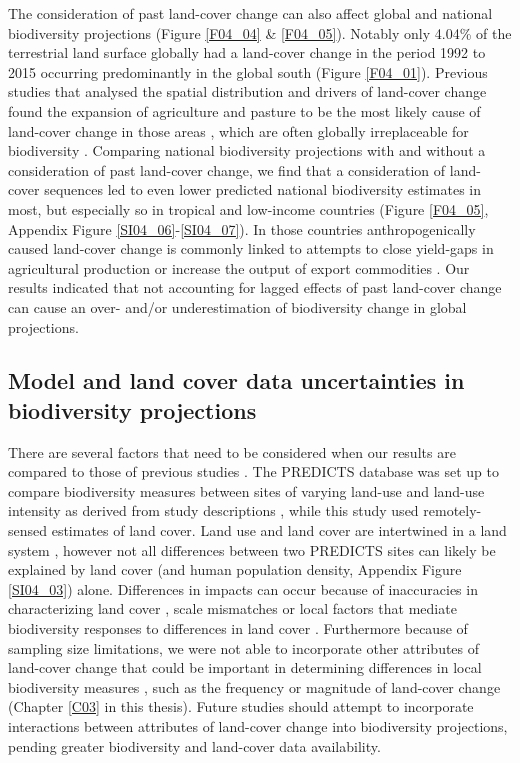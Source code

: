 The consideration of past land-cover change can also affect global and national biodiversity projections (Figure \ref{F04_04} \& \ref{F04_05}). Notably only 4.04\% of the terrestrial land surface globally had a land-cover change in the period 1992 to 2015 occurring predominantly in the global south (Figure \ref{F04_01}). Previous studies that analysed the spatial distribution and drivers of land-cover change \citep{Curtis2018,Nowosad2018} found the expansion of agriculture and pasture to be the most likely cause of land-cover change in those areas \citep{Phalan2013}, which are often globally irreplaceable for biodiversity \citep{Brooks2002,Laurance2014b,Pimm2014}. Comparing national biodiversity projections with and without a consideration of past land-cover change, we find that a consideration of land-cover sequences led to even lower predicted national biodiversity estimates in most, but especially so in tropical and low-income countries (Figure \ref{F04_05}, Appendix Figure \ref{SI04_06}-\ref{SI04_07}). In those countries anthropogenically caused land-cover change is commonly linked to attempts to close yield-gaps in agricultural production \citep{Mueller2012a} or increase the output of export commodities \citep{Byerlee2014,Meyfroidt2018}. Our results indicated that not accounting for lagged effects of past land-cover change can cause an over- and/or underestimation of biodiversity change in global projections.

\subsection{Model and land cover data uncertainties in biodiversity projections}
\label{C04_0402}

There are several factors that need to be considered when our results are compared to those of previous studies \citep{Newbold2015}. The PREDICTS database was set up to compare biodiversity measures between sites of varying land-use and land-use intensity as derived from study descriptions \citep{Newbold2015,Hudson2016}, while this study used remotely-sensed estimates of land cover. Land use and land cover are intertwined in a land system \citep{Lambin2006,Turner2007}, however not all differences between two PREDICTS sites can likely be explained by land cover (and human population density, Appendix Figure \ref{SI04_03}) alone. Differences in impacts can occur because of inaccuracies in characterizing land cover \citep{ESA2017}, scale mismatches \citep{Estes2018} or local factors that mediate biodiversity responses to differences in land cover \citep{Jung2016}. Furthermore because of sampling size limitations, we were not able to incorporate other attributes of land-cover change that could be important in determining differences in local biodiversity measures \citep{Watson2014}, such as the frequency \citep{Watson2014,Griffiths2015} or magnitude of land-cover change (Chapter \ref{C03} in this thesis). Future studies should attempt to incorporate interactions between attributes of land-cover change into biodiversity projections, pending greater biodiversity and land-cover data availability.

